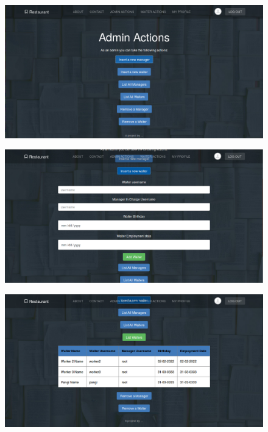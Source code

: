 \documentclass[12pt,english]{article}
\begin{document}
\begin{figure}[H]
\includegraphics[width=1\textwidth]{admin_1.png}
\end{figure}

\begin{figure}[H]
\includegraphics[width=1\textwidth]{admin_2.png}
\end{figure}

\begin{figure}[H]
\includegraphics[width=1\textwidth]{admin_3.png}
\end{figure}
\end{document}
